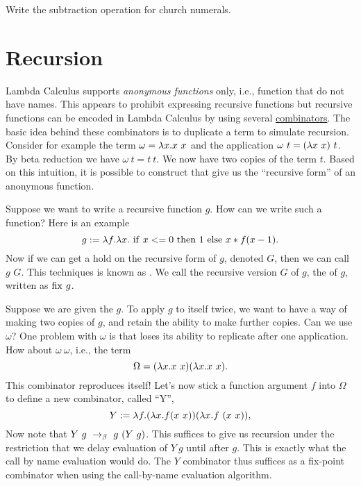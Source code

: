 \begin{exercise}
\label{xrcs:lcc:church-numerals::subtract}
Write the subtraction operation for church numerals.
\end{exercise}

\section{Recursion}
\label{sec:lcc:recursion}

\begin{gram}
\label{grm:lcc:recursion::intro}
Lambda Calculus supports {\em anonymous functions} only, i.e.,
function that do not have names.  
%
This appears to prohibit expressing recursive functions but recursive functions can be encoded in Lambda Calculus by using several 
\href{def:lcs::open-closed}{combinators}.
%
The basic idea behind these combinators is to duplicate a term to simulate recursion.
%
Consider for example the term $\omega = \lambda x. x~x$ and the application
$\omega~ t = (\lambda x~ x)~ t $.  
%
By beta reduction we have $\omega~ t =
t~ t $.  We now have two copies of the term $t$.  Based on this
intuition, it is possible to construct 
that give us the ``recursive form'' of an anonymous function.
\end{gram}

\begin{gram}
\label{grm:lcc:recursion::open}
Suppose we want to write a recursive function $g$.  How can we
write such a function?  Here is an example
\[
g   := \lambda f. \lambda x.~\mathrm{if}~x <= 0~\mathrm{then}~1~\mathrm{else}~x*f (x-1). 
\]
Now if we can get a hold on the recursive form of $g$, denoted $G$, then we can call $g$ $G$.
%
This techniques is known as .
%
%
We call the recursive version $G$ of $g$, the  of $g$,
written as $\mathrm{fix}~g$.
\end{gram}

\begin{gram}[$Y$ Combinator]
\label{grm:lcc:recursion::y-combinator}
Suppose we are given the
$g$.  To apply $g$ to itself twice, we want to have a way of
making two copies of $g$, and retain the ability to make further
copies. Can we use $\omega$? 
%
One problem with $\omega$ is that loses
its ability to replicate after one application.  How about
$\omega~\omega$, i.e., the term 
\[
\Omega = (\lambda x. x~x) (\lambda x. x~x).  
\]
This combinator reproduces itself!  
%
Let's now stick a
function argument $f$ into $\Omega$ to define a new combinator, called ``Y'',
\[
Y := \lambda f.  (\lambda x. f (x~  x)) (\lambda x. f~ (x~ x)),
\]
%
Now note that $Y~ g ~\rightarrow_{\beta}~ g~ (Y~ g)$. 
%
This suffices to give us
recursion under the restriction that we delay evaluation of $Y~ g$
until after $g$.  This is exactly what the call by name evaluation
would do.  The $Y$ combinator thus suffices as a fix-point
combinator when using the call-by-name evaluation algorithm.
\end{gram}

